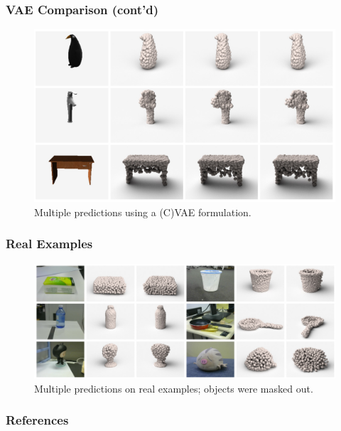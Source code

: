 \documentclass[14pt]{beamer}
\begin{document}
\begin{appendix}
    \begin{frame}
      \frametitle{VAE Comparison (cont'd)}
      \begin{figure}
        \centering
        \includegraphics[scale=0.65]{multiple_mon}
        \caption{Multiple predictions using a (C)VAE formulation.}
      \end{figure}
    \end{frame}
    
    \begin{frame}
      \frametitle{Real Examples}
      \begin{figure}
        \centering
        \hspace*{-0.25cm}\includegraphics[scale=0.4]{real}
        \caption{Multiple predictions on real examples; objects were masked out.}
      \end{figure}
    \end{frame}
  \end{appendix}
  
  \begin{frame}[allowframebreaks]
    \frametitle{References}
     
    
  \end{frame}
\end{document}
